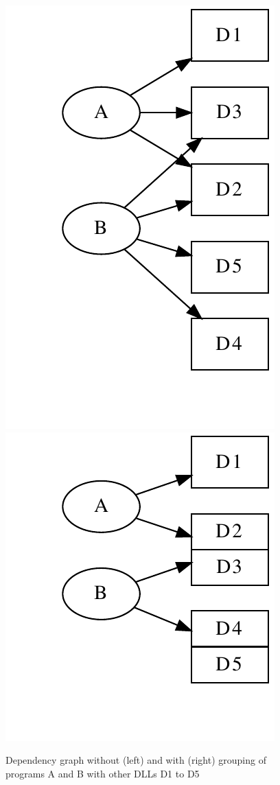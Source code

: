 \begin{figure}
\centering
\includegraphics[scale=0.4]{dep-example-split.pdf}
\hspace{15mm}
\includegraphics[scale=0.4]{dep-example-group.pdf}
\caption{Dependency graph without (left) and with (right) grouping of programs
A and B with other DLLs D1 to D5}
\label{fig:grouping}
\end{figure}


